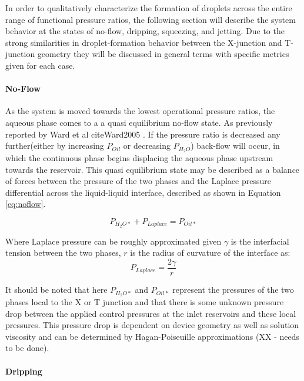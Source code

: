 \clearpage

In order to qualitatively characterize the formation of droplets across the entire range of functional pressure ratios, the following section will describe the system behavior at the states of no-flow, dripping, squeezing, and jetting. Due to the strong similarities in droplet-formation behavior between the X-junction and T-junction geometry they will be discussed in general terms with specific metrics given for each case.



\paragraph{No-Flow}
As the system is moved towards the lowest operational pressure ratios, the aqueous phase comes to a a quasi equilibrium no-flow state. As previously reported by Ward et al cite{Ward2005} . If the pressure ratio is decreased any further(either by increasing $P_{Oil}$ or decreasing $P_{H_2O}$) back-flow will occur, in which the continuous phase begins displacing the aqueous phase upstream towards the reservoir. This quasi equilibrium state may be described as a balance of forces between the pressure of the two phases and the Laplace pressure differential across the liquid-liquid interface, described as shown in Equation \vref{eq:noflow}.

\begin{equation}
P_{H_2O*} + P_{Laplace} = P_{Oil*} 
\label{eq:noflow}
\end{equation}

Where Laplace pressure can be roughly approximated given $\gamma$ is the interfacial tension between the two phases, $r$ is the radius of curvature of the interface as:
\begin{equation}
 P_{Laplace} = \frac{2 \gamma}{r}
\label{eq:laplace}
\end{equation}

It should be noted that here $P_{H_2O*}$ and $P_{Oil*}$ represent the pressures of the two phases local to the X or T junction and that there is some unknown pressure drop between the applied control pressures at the inlet reservoirs and these local pressures. This pressure drop is dependent on device geometry as well as solution viscosity and can be determined by Hagan-Poiseuille approximations (XX - needs to be done). 
 
\paragraph{Dripping}

